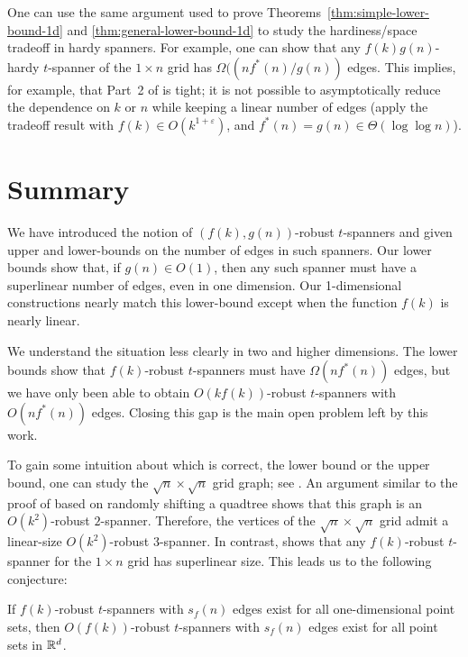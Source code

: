 \documentclass{patmorin}
\newcommand{\eps}{\varepsilon}
\begin{document}
\begin{rem}
One can use the same argument used to prove
Theorems~\ref{thm:simple-lower-bound-1d} and
\ref{thm:general-lower-bound-1d} to study the hardiness/space tradeoff
in hardy spanners.  For example, one can show that any $f(k)g(n)$-hardy
$t$-spanner of the $1\times n$ grid has $\Omega((nf^*(n)/g(n))$ edges.
This implies, for example, that Part~2 of  is tight;
it is not possible to asymptotically reduce the dependence on $k$ or $n$
while keeping a linear number of edges (apply the tradeoff result with
$f(k)\in O(k^{1+\eps})$, and $f^*(n)=g(n)\in \Theta(\log\log n)$).
\end{rem}

\section{Summary}

We have introduced the notion of $(f(k),g(n))$-robust $t$-spanners and
given upper and lower-bounds on the number of edges in such spanners.
Our lower bounds show that, if $g(n)\in O(1)$, then any such spanner
must have a superlinear number of edges, even in one dimension.  Our
1-dimensional constructions nearly match this lower-bound except when the
function $f(k)$ is nearly linear.

We understand the situation less clearly in two and higher dimensions.
The lower bounds show that $f(k)$-robust $t$-spanners must have
$\Omega(nf^*(n))$ edges, but we have only been able to obtain
$O(kf(k))$-robust $t$-spanners with $O(nf^*(n))$ edges.  Closing this
gap is the main open problem left by this work.

To gain some intuition about which is correct, the lower bound
or the upper bound, one can study the $\sqrt{n}\times\sqrt{n}$
grid graph; see .  An argument similar to the proof of
 based on randomly shifting a quadtree shows that this
graph is an $O(k^2)$-robust $2$-spanner.  Therefore, the vertices of
the $\sqrt{n}\times\sqrt{n}$ grid admit a linear-size $O(k^2)$-robust
3-spanner.  In contrast,  shows that any
$f(k)$-robust $t$-spanner for the $1\times n$ grid has superlinear size.
This leads us to the following conjecture:

\begin{conj}
If $f(k)$-robust $t$-spanners with $s_f(n)$ edges exist for all one-dimensional point sets, then $O(f(k))$-robust $t$-spanners with $s_f(n)$ edges exist for all point sets in $\mathbb{R}^d$.
\end{conj}
\end{document}
